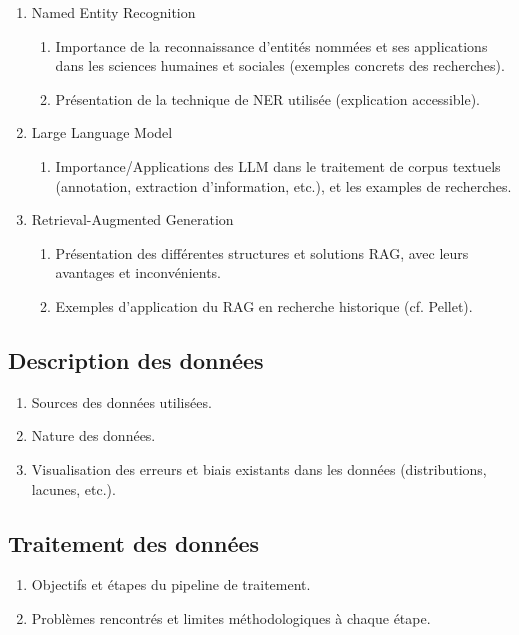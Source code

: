 \documentclass[12pt]{article}
\begin{document}
\begin{enumerate}[label=\alph*.]
    \item Named Entity Recognition
        \begin{enumerate}
        \item Importance de la reconnaissance d’entités nommées et ses applications dans les sciences humaines et sociales (exemples concrets des recherches).
        \item Présentation de la technique de NER utilisée (explication accessible).
        \end{enumerate}
    \item Large Language Model
        \begin{enumerate}
        \item Importance/Applications des LLM dans le traitement de corpus textuels (annotation, extraction d’information, etc.), et les examples de recherches.
        \end{enumerate}
    \item Retrieval-Augmented Generation
        \begin{enumerate}
        \item Présentation des différentes structures et solutions RAG, avec leurs avantages et inconvénients.
        \item Exemples d’application du RAG en recherche historique (cf. Pellet).
        \end{enumerate}
\end{enumerate}

\subsection*{Description des données}

\begin{enumerate}[label=\alph*.]
    \item Sources des données utilisées.
    \item Nature des données.
    \item Visualisation des erreurs et biais existants dans les données (distributions, lacunes, etc.).
\end{enumerate}

\subsection*{Traitement des données}

\begin{enumerate}[label=\alph*.]
    \item Objectifs et étapes du pipeline de traitement.
    \item Problèmes rencontrés et limites méthodologiques à chaque étape.
\end{enumerate}
\end{document}
